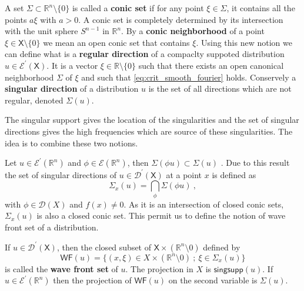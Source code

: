 \documentclass[12pt]{book}
\newcommand{\WF}{\mathsf{WF}}
\newcommand{\Dcal}{\mathcal{D}}
\newcommand{\Ecal}{\mathcal{E}}
\newcommand{\Rbb}{\mathbb{R}}
\newcommand{\Xsf}{\mathsf{X}}
\theoremstyle{break}
\begin{document}


A set $\Sigma \subset \Rbb^n \setminus \{0\}$ is called a \textbf{conic set} if for any point $\xi \in \Sigma$, it contains all the points $a \xi$ with $a > 0$. A conic set is completely determined by its intersection with the unit sphere $S^{n-1}$ in $\Rbb^n$. By a \textbf{conic neighborhood} of a point $\xi \in \Xsf \setminus \{0\}$ we mean an open conic set that contains $\xi$. Using this new notion we can define what is a \textbf{regular direction} of a compaclty suppoted distribution $u\in\Ecal^\prime(\Xsf)$. It is a vector $\xi \in \Rbb\setminus\{0\}$ such that there exists an open canonical neighborhood $\Sigma$ of $\xi$ and such that \eqref{eq:crit_smooth_fourier} holds. Conservely a \textbf{singular direction} of a distribution $u$ is the set of all directions which are not regular, denoted $\Sigma (u)$.




The singular support gives the location of the singularities and the set of singular directions gives the high frequencies which are source of these singularities. The idea is to combine these two notions.



Let $u \in \Ecal^\prime(\Rbb^n)$ and $\phi \in \Ecal(\Rbb^n)$, then $\Sigma(\phi u) \subset \Sigma(u)$ \cite{hormander_analysis_1990}. Due to this result the set of singular directions of $u\in\Dcal^\prime(\Xsf)$ at a point $x$ is defined as
%
\begin{equation*}
\Sigma_x(u) = \underset{\phi}{\bigcap} \Sigma(\phi u) \ , 
\end{equation*}
%
with $\phi \in \Dcal(X)$ and $f(x) \neq 0$. As it is an intersection of closed conic sets, $\Sigma_x(u)$ is also a closed conic set. This permit us to define the notion of wave front set of a distribution. 




If $u \in \Dcal^\prime(\Xsf)$, then the closed subset of $\Xsf \times (\Rbb^n \setminus 0)$ defined by
%
\begin{equation*}
\WF(u) = \bigg\{ (x,\xi) \in X \times (\Rbb^n \setminus 0) \ ; \ \xi \in \Sigma_x(u) \bigg\}
\end{equation*}
is called the \textbf{wave front set} of $u$. The projection in $X$ is $\mathsf{singsupp}(u)$. If $u \in \Ecal^\prime(\Rbb^n)$ then the projection of $\WF(u)$ on the second variable is $\Sigma(u)$. 
\end{document}
